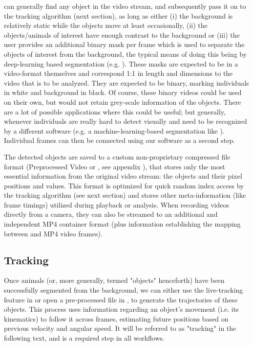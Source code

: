 \documentclass[9pt,lineno]{elife}
\newcommand{\TRex}{\protect\path{TRex}}
\newcommand{\TGrabs}{\protect\path{TGrabs}}
\begin{document}
{\color{blue}\TGrabs{} can generally find any object in the video stream, and subsequently pass it on to the tracking algorithm (next section),} as long as either (i) the background is relatively static while the objects move at least occasionally, (ii) the objects/animals of interest have enough contrast to the background or (iii) the user provides an additional binary mask per frame which is used to separate the objects {\color{blue}of interest} from the background, the typical means of doing this being by deep-learning based segmentation (e.g. \citealt{Cae+17}). These masks are expected to be in a video-format themselves and correspond 1:1 in length and dimensions to the video that is to be analyzed. They are expected to be binary, marking individuals in white and background in black. Of course, these binary videos could be {\color{blue} used} on their own, but would not retain grey-scale information {\color{blue} of the objects}. There are a lot of possible applications where this could be useful; but generally, whenever individuals are really hard to detect visually and need to be recognized by a different software (e.g. a machine-learning-based {\color{blue}segmentation} like \citealt{Man+18b}). Individual frames can then be connected using our software as a second step.

The detected objects are saved to a custom non-proprietary compressed file format (Preprocessed Video or \protect{}, see appendix ), that stores only the most essential information from the original video stream: the objects and their pixel positions and values. This format is optimized for quick random index access by the tracking {\color{blue}algorithm (see next section)} and stores other meta-information (like frame timings) utilized during playback or analysis. When recording videos directly from a camera, they can also be streamed to an additional and independent MP4 container format (plus information establishing the mapping between \protect{} and MP4 video frames).

\subsection{Tracking} \label{sec:tracking}

Once animals (or, more generally, termed "objects" henceforth) have been successfully segmented from the background, we can either use the live-tracking feature in \TGrabs{} or open a pre-processed file in \TRex{}, to generate the trajectories of these objects. This process uses information regarding an object's movement (i.e. its kinematics) to follow it across frames, estimating future positions based on previous velocity and angular speed. It will be referred to as "tracking" in the following text, and is a required step in all workflows.
\end{document}
